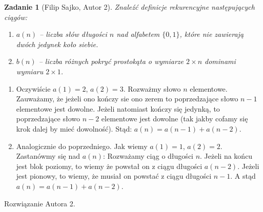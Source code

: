 \documentclass{mwart}
\newtheorem{zad}{Zadanie}[section]
\begin{document}
\begin{zad}[Filip Sajko, Autor 2]
    Znaleźć definicje rekurencyjne następujących ciągów:
    \begin{enumerate}
        \item $a(n)$ -- liczba słów długości $n$ nad alfabetem
              $\{0, 1\}$, które nie zawierają dwóch jedynek koło siebie.
        \item  $b(n)$ -- liczba różnych pokryć prostokąta o wymiarze
              $2 \times n$ dominami wymiaru $2 \times 1$.
    \end{enumerate}
\end{zad}
\begin{mdframed}
    \begin{enumerate}

        \item Oczywiście $a(1)=2$, $a(2)=3$.  Rozważmy słowo $n$ elementowe.
              Zauważamy, że jeżeli ono kończy sie ono zerem to poprzedzające słowo $n-1$
              elementowe jest dowolne. Jeżeli natomiast kończy się jedynką,
              to poprzedzające słowo $n-2$ elementowe jest dowolne
              (tak jakby cofamy się krok dalej by mieć dowolność).
              Stąd: $a(n)=a(n-1)+a(n-2)$.
        \item Analogicznie do poprzedniego. Jak wiemy $a(1) = 1$, $a(2) = 2$. Zastanówmy się nad $a(n)$:
              Rozważamy ciąg o długości $n$. Jeżeli na końcu jest blok poziomy,
              to wiemy że powstał on z ciągu długości $a(n-2)$.
              Jeżeli jest pionowy, to wiemy, że musiał on powstać z ciągu długości $n-1$.
              A stąd $a(n) = a(n-1) + a(n-2)$.
    \end{enumerate}
\end{mdframed}
\begin{mdframed}
    Rozwiązanie Autora 2.
\end{mdframed}
\end{document}
